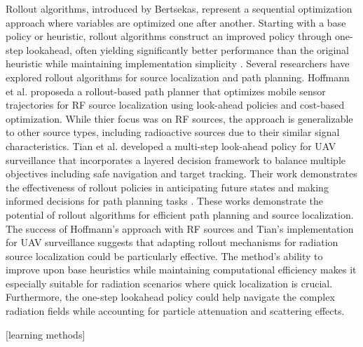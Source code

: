 \documentclass[../report.tex]{subfiles}
\begin{document}
    Rollout algorithms, introduced by Bertsekas, represent a sequential optimization approach where variables are optimized one after another. Starting with a base policy or heuristic, rollout
    algorithms construct an improved policy through one-step lookahead, often yielding significantly better performance than the original heuristic while maintaining implementation 
    simplicity \cite{bertsekas2013rollout}. Several researchers have explored rollout algorithms for source localization and path planning. Hoffmann et al. proposeda
    a rollout-based path planner that optimizes mobile sensor trajectories for RF source localization using look-ahead policies and cost-based optimization. While thier focus was on RF sources, 
    the approach is generalizable to other source types, including radioactive sources due to their similar signal characteristics\cite{rolloutHoffmann2019}. Tian et al. developed 
    a multi-step look-ahead policy for UAV surveillance that incorporates a layered decision framework to balance multiple objectives including safe navigation and target tracking. Their work 
    demonstrates the effectiveness of rollout policies in anticipating future states and making informed decisions for path planning tasks \cite{rolloutMultiStepLookaheadTian2008}. 
    These works demonstrate the potential of rollout algorithms for efficient path planning and source localization.   The success of Hoffmann's approach with RF sources and Tian's implementation
    for UAV surveillance suggests that adapting rollout mechanisms for radiation source localization could be particularly effective. The method's ability to improve upon base heuristics while
    maintaining computational efficiency makes it especially suitable for radiation scenarios where quick localization is crucial. Furthermore, the one-step lookahead policy could help navigate 
    the complex radiation fields while accounting for particle attenuation and scattering effects.
    
    [learning methods]
\end{document}
